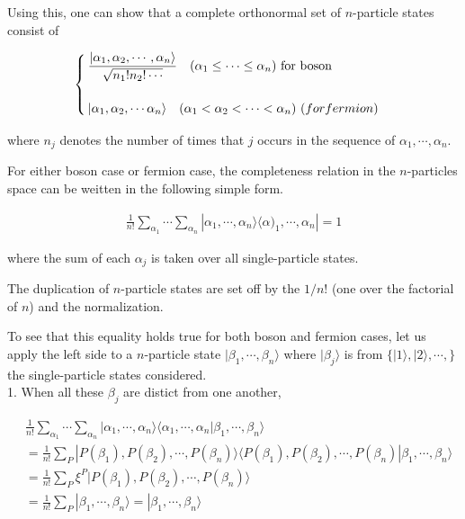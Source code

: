Using this, one can show that a complete orthonormal set of $n$-particle states consist of

\begin{align}\begin{cases}
\displaystyle\frac{|\alpha_1,\alpha_2,\cdots,\alpha_n\rangle}{\sqrt{n_1!n_2!\cdots}} \quad (\alpha_1\le\cdots\le\alpha_n) \ \text{for boson}\\
\ \\
|\alpha_1,\alpha_2,\cdots\alpha_n\rangle \quad (\alpha_1<\alpha_2<\cdots<\alpha_n)\ \text(for fermion)
\end{cases}\end{align}

where $n_j$ denotes the number of times that $j$ occurs in the sequence of $\alpha_1,\cdots,\alpha_n$. 

For either boson case or fermion case, the completeness relation in the $n$-particles space can be weitten in the following simple form. 

\begin{align}
\frac{1}{n!}\sum_{\alpha_1}\cdots\sum_{\alpha_n}|\alpha_1,\cdots,\alpha_n\rangle\langle\alpha)_1,\cdots,\alpha_n| = 1
\end{align}

where the sum of each $\alpha_j$ is taken over all single-particle states. 

The duplication of $n$-particle states are set off by the $1/n!$ (one over the factorial of $n$) and the normalization. 

To see that this equality holds true for both boson and fermion cases, let us apply the left side to a $n$-particle state $|\beta_1,\cdots,\beta_n\rangle$ where $|\beta_j\rangle$ is from $\{|1\rangle,|2\rangle,\cdots,\}$ the single-particle states considered. \\

{\Huge 1. }When all these $\beta_j$ are distict from one another, 

\[\begin{split}
&\frac{1}{n!}\sum_{\alpha_1}\cdots\sum_{\alpha_n}|\alpha_1,\cdots,\alpha_n\rangle\langle\alpha_1,\cdots,\alpha_n|\beta_1,\cdots,\beta_n\rangle\\
&=\frac{1}{n!}\sum_P|P(\beta_1),P(\beta_2),\cdots,P(\beta_n)\rangle\langle P(\beta_1),P(\beta_2),\cdots,P(\beta_n)|\beta_1,\cdots,\beta_n\rangle\\
&=\frac{1}{n!}\sum_P\xi^P|P(\beta_1),P(\beta_2),\cdots,P(\beta_n)\rangle\\
&=\frac{1}{n!}\sum_P|\beta_1,\cdots,\beta_n\rangle = |\beta_1,\cdots,\beta_n\rangle
\end{split}\]


